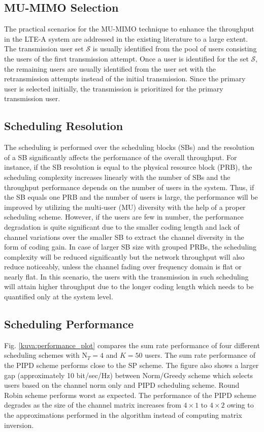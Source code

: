 \documentclass[conference]{./../../IEEE/IEEEtran}
\begin{document}
\subsection{MU-MIMO Selection}

The practical scenarios for the MU-MIMO technique to enhance the throughput in the LTE-A system are addressed in the existing literature to a large extent. The transmission user set $\mathcal{S}$ is usually identified from the pool of users consisting the users of the first transmission attempt. Once a user is identified for the set $\mathcal{S}$, the remaining users are usually identified from the user set with the retransmission attempts instead of the initial transmission. Since the primary user is selected initially, the transmission is prioritized for the primary transmission user.

\subsection{Scheduling Resolution}
The scheduling is performed over the scheduling blocks (SBs) and the resolution of a SB significantly affects the performance of the overall throughput. For instance, if the SB resolution is equal to the physical resource block (PRB), the scheduling complexity increases linearly with the number of SBs and the throughput performance depends on the number of users in the system. Thus, if the SB equals one PRB and the number of users is large, the performance will be improved by utilizing the multi-user (MU) diversity with the help of a proper scheduling scheme. However, if the users are few in number, the performance degradation is quite significant due to the smaller coding length and lack of channel variations over the smaller SB to extract the channel diversity in the form of coding gain. In case of larger SB size with grouped PRBs, the scheduling complexity will be reduced significantly but the network throughput will also reduce noticeably, unless the channel fading over frequency domain is flat or nearly flat. In this scenario, the users with the transmission in such scheduling will attain higher throughput due to the longer coding length which needs to be quantified only at the system level.

\subsection{Scheduling Performance}

Fig. \ref{kuva:performance_plot} compares the sum rate performance of four different scheduling schemes with $\textrm{N}_T = 4$ and $K = 50$ users. The sum rate performance of the PIPD scheme performs close to the SP scheme. The figure also shows a larger gap (approximately 10 bit/sec/Hz) between Norm/Greedy scheme which selects users based on the channel norm only and PIPD scheduling scheme. Round Robin scheme performs worst as expected. The performance of the PIPD scheme degrades as the size of the channel matrix increases from $4 \times 1$ to $4 \times 2$ owing to the approximations performed in the algorithm instead of computing matrix inversion.
\end{document}
